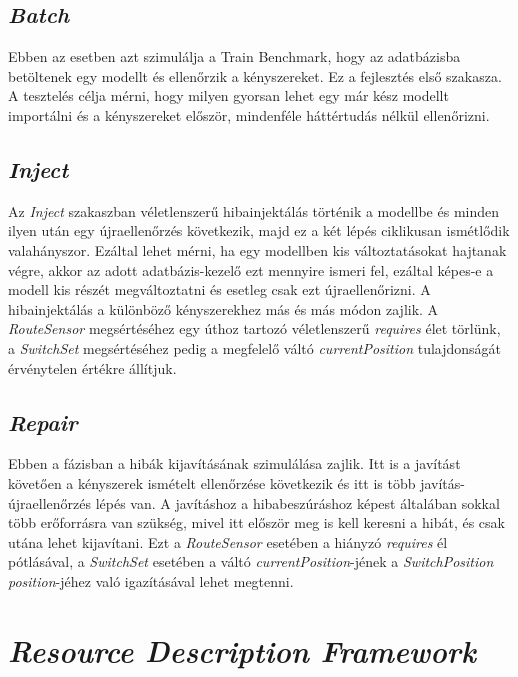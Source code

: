 \subsection{\emph{Batch}}

Ebben az esetben azt szimulálja a Train Benchmark, hogy az adatbázisba betöltenek egy modellt és ellenőrzik a kényszereket. Ez a fejlesztés első szakasza. A tesztelés célja mérni, hogy milyen gyorsan lehet egy már kész modellt importálni és a kényszereket először, mindenféle háttértudás nélkül ellenőrizni.

\subsection{\emph{Inject}}

Az \emph{Inject} szakaszban véletlenszerű hibainjektálás történik a modellbe és minden ilyen után egy újraellenőrzés következik, majd ez a két lépés ciklikusan ismétlődik valahányszor. Ezáltal lehet mérni, ha egy modellben kis változtatásokat hajtanak végre, akkor az adott adatbázis-kezelő ezt mennyire ismeri fel, ezáltal képes-e a modell kis részét megváltoztatni és esetleg csak ezt újraellenőrizni. A hibainjektálás a különböző kényszerekhez más és más módon zajlik. A \emph{RouteSensor} megsértéséhez egy úthoz tartozó véletlenszerű \emph{requires} élet törlünk, a \emph{SwitchSet} megsértéséhez pedig a megfelelő váltó \emph{currentPosition} tulajdonságát érvénytelen értékre állítjuk.

\subsection{\emph{Repair}}

Ebben a fázisban a hibák kijavításának szimulálása zajlik. Itt is a javítást követően a kényszerek ismételt ellenőrzése következik és itt is több javítás-újraellenőrzés lépés van. A javításhoz a hibabeszúráshoz képest általában sokkal több erőforrásra van szükség, mivel itt először meg is kell keresni a hibát, és csak utána lehet kijavítani. Ezt a \emph{RouteSensor} esetében  a hiányzó \emph{requires} él pótlásával, a \emph{SwitchSet} esetében a váltó \emph{currentPosition}-jének a \emph{SwitchPosition} \emph{position}-jéhez való igazításával lehet megtenni.

\section{\emph{Resource Description Framework}}

